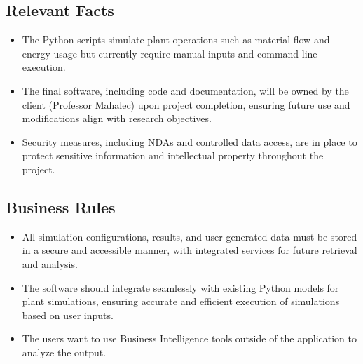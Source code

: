\documentclass[12pt]{article}
\begin{document}
\subsection*{Relevant Facts}
\begin{itemize}
    
    \item The Python scripts simulate plant operations such as material flow and energy usage but currently require manual inputs and command-line execution.

    \item The final software, including code and documentation, will be owned by the client (Professor Mahalec) upon project completion, ensuring future use and modifications align with research objectives.

    \item Security measures, including NDAs and controlled data access, are in place to protect sensitive information and intellectual property throughout the project.
\end{itemize}

\subsection{Business Rules}
\begin{itemize}
    \item All simulation configurations, results, and user-generated data must be stored in a secure and accessible manner, with integrated services for future retrieval and analysis.
    \item The software should integrate seamlessly with existing Python models for plant simulations, ensuring accurate and efficient execution of simulations based on user inputs.
    \item The users want to use Business Intelligence tools outside of the application to analyze the output.
\end{itemize}              
\end{document}

